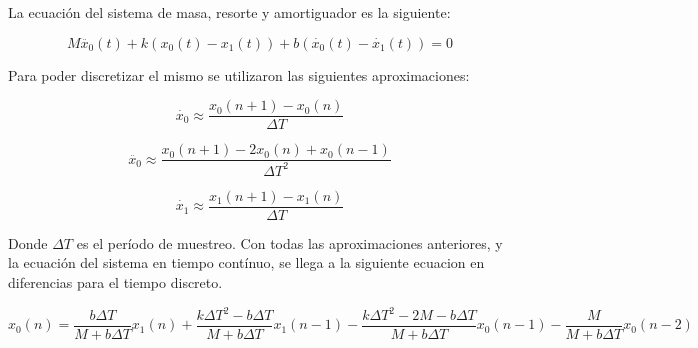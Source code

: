 La ecuación del sistema de masa, resorte y amortiguador es la siguiente:

\begin{equation*}
	M \ddot{x_{0}}(t) + k (x_{0}(t) - x_{1}(t)) + b (\dot{x_{0}}(t) - \dot{x_{1}}(t)) = 0
\end{equation*}

Para poder discretizar el mismo se utilizaron las siguientes aproximaciones:

\begin{equation*}
	\dot{x_{0}} \approx \frac{x_{0}(n + 1) - x_{0}(n)}{\Delta T}
\end{equation*}

\begin{equation*}
	\ddot{x_{0}} \approx \frac{x_{0}(n + 1) - 2 x_{0}(n) + x_{0}(n - 1)}{\Delta T^2}
\end{equation*}

\begin{equation*}
	\dot{x_{1}} \approx \frac{x_{1}(n + 1) - x_{1}(n)}{\Delta T}
\end{equation*}

Donde $\Delta T$ es el período de muestreo. Con todas las aproximaciones anteriores, y la ecuación del sistema en tiempo contínuo, se llega a la siguiente ecuacion en diferencias para el tiempo discreto.

\begin{equation*}
	x_{0}(n) = \frac{b \Delta T}{M + b \Delta T} x_{1}(n) + \frac{k \Delta T^2 - b \Delta T}{M + b \Delta T} x_{1}(n - 1) - \frac{k \Delta T^2 - 2 M - b \Delta T}{M + b \Delta T} x_{0}(n - 1) - \frac{M}{M + b \Delta T} x_{0}(n - 2)
\end{equation*}

